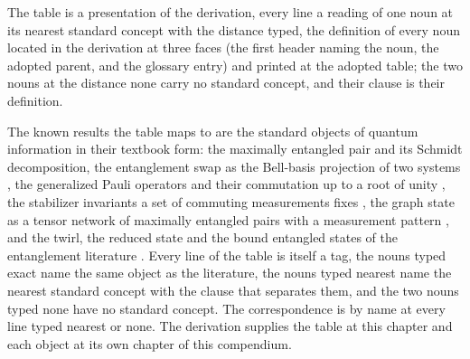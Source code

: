 \chdeps{}{}
The table is a presentation of the derivation, every line a reading of one noun at its nearest standard concept with the distance typed, the definition of every noun located in the derivation at three faces (the first header naming the noun, the adopted parent, and the glossary entry) and printed at the adopted table; the two nouns at the distance none carry no standard concept, and their clause is their definition.

\begin{chbridge}
The known results the table maps to are the standard objects of quantum information in their textbook form: the maximally entangled pair and its Schmidt decomposition, the entanglement swap as the Bell-basis projection of two systems \cite{Zukowski1993}, the generalized Pauli operators and their commutation up to a root of unity \cite{Weyl1927}, the stabilizer invariants a set of commuting measurements fixes \cite{Gottesman1997}, the graph state as a tensor network of maximally entangled pairs with a measurement pattern \cite{Raussendorf2001}, and the twirl, the reduced state and the bound entangled states of the entanglement literature \cite{Horodecki2009}.
Every line of the table is itself a tag, the nouns typed exact name the same object as the literature, the nouns typed nearest name the nearest standard concept with the clause that separates them, and the two nouns typed none have no standard concept. The correspondence is by name at every line typed nearest or none. The derivation supplies the table at this chapter and each object at its own chapter of this compendium.
\end{chbridge}
